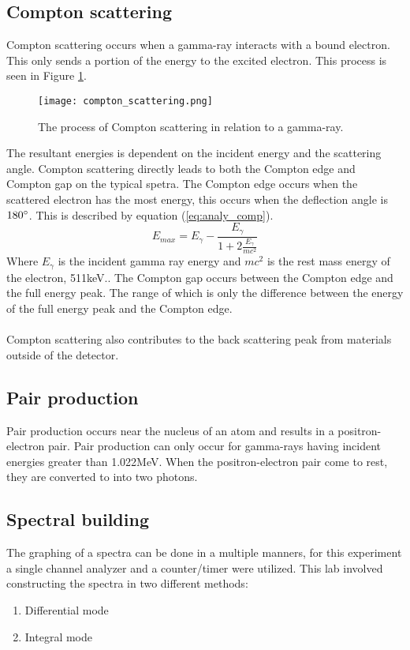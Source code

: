 \documentclass[..Spectroscopy.tex]{subfiles}
\begin{document}
\subsection{Compton scattering}
	Compton scattering occurs when a gamma-ray interacts with a bound electron. This only sends a portion of the energy to the excited electron. This process is seen in Figure \ref{fig:compton}. 
	\begin{figure}[h!]
		\centering
		\texttt{[image: compton\_scattering.png]}
		\caption{The process of Compton scattering in relation to a gamma-ray.\cite{mcgregor}}
		\label{fig:compton}
	\end{figure}
The resultant energies is dependent on the incident energy and the scattering angle. Compton scattering directly leads to both the Compton edge and Compton gap on the typical spetra.  The Compton edge occurs when the scattered electron has the most energy, this occurs when the deflection angle is $180\degree$. This is described by equation (\ref{eq:analy_comp}). 
	\begin{equation}
		E_{max}=E_\gamma -\frac{E_\gamma}{1+2 \frac{E_\gamma}{mc^2}}
		\label{eq:analy_comp}
	\end{equation}
Where $E_\gamma$ is the incident gamma ray energy and $mc^2$ is the rest mass energy of the electron, 511keV.\cite{mcgregor}. The Compton gap occurs between the Compton edge and the full energy peak. The range of which is only the difference between the energy of the full energy peak and the Compton edge. \\ \\
\noindent
	Compton scattering also contributes to the back scattering peak from materials outside of the detector.

\subsection{Pair production}
	Pair production occurs near the nucleus of an atom and results in a positron-electron pair. Pair production can only occur for gamma-rays having incident energies greater than 1.022MeV. When the positron-electron pair come to rest, they are converted to into two photons. 

\subsection{Spectral building}
	The graphing of a spectra can be done in a multiple manners, for this experiment a single channel analyzer and a counter/timer were utilized. This lab involved constructing the spectra in two different methods:
	\begin{enumerate}
		\item Differential mode
		\item Integral mode
	\end{enumerate}
\end{document}
